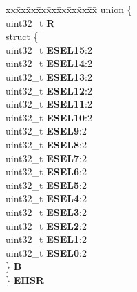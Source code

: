 \begin{DoxyCompactItemize}
\begin{tabbing}
\end{tabbing}\item 
\mbox{\label{structSIU__tag_a3c18cd7b2febe40528837abd78995dcb}} 
\begin{tabbing}
xx\=xx\=xx\=xx\=xx\=xx\=xx\=xx\=xx\=\kill
union \{\\
\>uint32\_t {\bfseries R}\\
\>struct \{\\
\>\>uint32\_t {\bfseries ESEL15}:2\\
\>\>uint32\_t {\bfseries ESEL14}:2\\
\>\>uint32\_t {\bfseries ESEL13}:2\\
\>\>uint32\_t {\bfseries ESEL12}:2\\
\>\>uint32\_t {\bfseries ESEL11}:2\\
\>\>uint32\_t {\bfseries ESEL10}:2\\
\>\>uint32\_t {\bfseries ESEL9}:2\\
\>\>uint32\_t {\bfseries ESEL8}:2\\
\>\>uint32\_t {\bfseries ESEL7}:2\\
\>\>uint32\_t {\bfseries ESEL6}:2\\
\>\>uint32\_t {\bfseries ESEL5}:2\\
\>\>uint32\_t {\bfseries ESEL4}:2\\
\>\>uint32\_t {\bfseries ESEL3}:2\\
\>\>uint32\_t {\bfseries ESEL2}:2\\
\>\>uint32\_t {\bfseries ESEL1}:2\\
\>\>uint32\_t {\bfseries ESEL0}:2\\
\>\} {\bfseries B}\\
\} {\bfseries EIISR}\\


\end{tabbing}
\end{DoxyCompactItemize}

